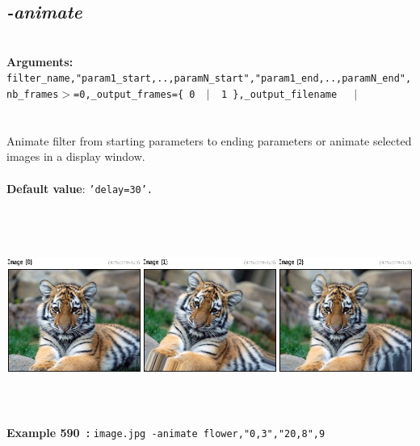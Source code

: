 \documentclass[a4paper,11pt,twoside]{book}
\begin{document}
\subsection{\emph{-animate} }\vspace*{-0.5em}
~\\\textbf{Arguments: } 
{\small \texttt{filter\_name,"param1\_start,..,paramN\_start","param1\_end,..,paramN\_end",nb\_frames$>$=0,\_output\_frames=\{ 0 ~$|$~ 1 \},\_output\_filename}}~~~$|$\\
\\~\\
Animate filter from starting parameters to ending parameters or animate selected images
in a display window.
~\\~\\\textbf{Default value}: {\small \texttt{'delay=30'.}}
\begin{center}\includegraphics[keepaspectratio=true,height=7cm,width=\textwidth]{img/gmic_def590.jpg}\\
{\footnotesize \textbf{Example 590~:} \texttt{image.jpg -animate flower,"0,3","20,8",9}}
\end{center}
\end{document}
